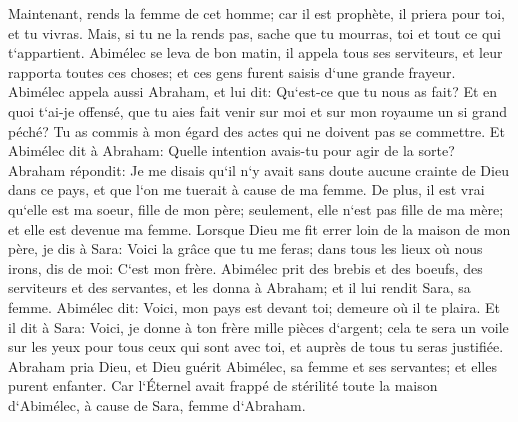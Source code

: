 \verse Maintenant, rends la femme de cet homme; car il est prophète, il priera pour toi, et tu vivras. Mais, si tu ne la rends pas, sache que tu mourras, toi et tout ce qui t`appartient. 
\verse Abimélec se leva de bon matin, il appela tous ses serviteurs, et leur rapporta toutes ces choses; et ces gens furent saisis d`une grande frayeur. 
\verse Abimélec appela aussi Abraham, et lui dit: Qu`est-ce que tu nous as fait? Et en quoi t`ai-je offensé, que tu aies fait venir sur moi et sur mon royaume un si grand péché? Tu as commis à mon égard des actes qui ne doivent pas se commettre. 
\verse Et Abimélec dit à Abraham: Quelle intention avais-tu pour agir de la sorte? 
\verse Abraham répondit: Je me disais qu`il n`y avait sans doute aucune crainte de Dieu dans ce pays, et que l`on me tuerait à cause de ma femme. 
\verse De plus, il est vrai qu`elle est ma soeur, fille de mon père; seulement, elle n`est pas fille de ma mère; et elle est devenue ma femme. 
\verse Lorsque Dieu me fit errer loin de la maison de mon père, je dis à Sara: Voici la grâce que tu me feras; dans tous les lieux où nous irons, dis de moi: C`est mon frère. 
\verse Abimélec prit des brebis et des boeufs, des serviteurs et des servantes, et les donna à Abraham; et il lui rendit Sara, sa femme. 
\verse Abimélec dit: Voici, mon pays est devant toi; demeure où il te plaira. 
\verse Et il dit à Sara: Voici, je donne à ton frère mille pièces d`argent; cela te sera un voile sur les yeux pour tous ceux qui sont avec toi, et auprès de tous tu seras justifiée. 
\verse Abraham pria Dieu, et Dieu guérit Abimélec, sa femme et ses servantes; et elles purent enfanter. 
\verse Car l`Éternel avait frappé de stérilité toute la maison d`Abimélec, à cause de Sara, femme d`Abraham. 

